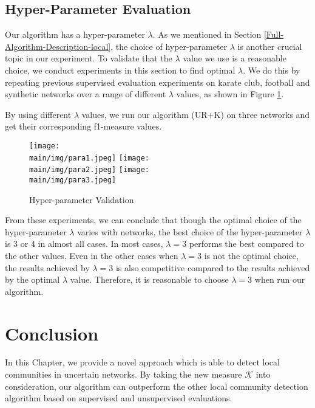 \documentclass[\main/thesis.tex]{subfiles}
\begin{document}
\subsection{Hyper-Parameter Evaluation} \label{Hyper-Parameter-Evaluation-Local}
Our algorithm has a hyper-parameter $\lambda$. As we mentioned in Section \ref{Full-Algorithm-Description-local}, the choice of hyper-parameter $\lambda$ is another crucial topic in our experiment. To validate that the $\lambda$ value we use is a reasonable choice, we conduct experiments in this section to find optimal $\lambda$. We do this by repeating previous supervised evaluation experiments on karate club, football and synthetic networks over a range of different $\lambda$ values, as shown in Figure \ref{Hyper-Parameter-Evaluation-local-graph}. 

By using different $\lambda$ values, we run our algorithm (UR+K) on three networks and get their corresponding f1-measure values. 

\begin{figure}
\texttt{[image: \\main/img/para1.jpeg]}
\texttt{[image: \\main/img/para2.jpeg]}
\centering
\texttt{[image: \\main/img/para3.jpeg]}
\caption{Hyper-parameter Validation}
\label{Hyper-Parameter-Evaluation-local-graph}
\end{figure}

From these experiments, we can conclude that though the optimal choice of the hyper-parameter $\lambda$ varies with networks, the best choice of the hyper-parameter $\lambda$ is 3 or 4 in almost all cases. In most cases, $\lambda=3$ performs the best compared to the other values. Even in the other cases when $\lambda=3$ is not the optimal choice, the results achieved by $\lambda=3$ is also competitive compared to the results achieved by the optimal $\lambda$ value. Therefore, it is reasonable to choose $\lambda=3$ when run our algorithm.

\section{Conclusion}
In this Chapter, we provide a novel approach which is able to detect local communities in uncertain networks. By taking the new measure $\mathcal{K}$ into consideration, our algorithm can outperform the other local community detection algorithm based on supervised and unsupervised evaluations.
\end{document}
